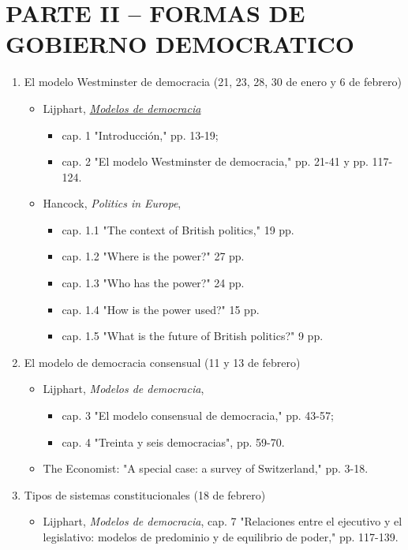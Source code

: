 \documentclass{article}
\begin{document}
\section{PARTE II – FORMAS DE GOBIERNO DEMOCRATICO}
\label{sec:orgbfedb29}
\begin{enumerate}
\item El modelo Westminster de democracia  (21, 23, 28, 30 de enero y 6 de febrero)
\label{sec:org8bf7db2}
\begin{itemize}
\item Lijphart, \href{https://github.com/emagar/ep3/blob/master/lecturas/lijphart-mod-democ}{\emph{Modelos de democracia}}
\begin{itemize}
\item cap. 1 "Introducción," pp. 13-19;
\item cap. 2 "El modelo Westminster de democracia," pp. 21-41 y pp. 117-124.
\end{itemize}
\item Hancock, \emph{Politics in Europe}, 
\begin{itemize}
\item cap. 1.1 "The context of British politics," 19 pp.
\item cap. 1.2 "Where is the power?" 27 pp.
\item cap. 1.3 "Who has the power?" 24 pp.
\item cap. 1.4 "How is the power used?" 15 pp.
\item cap. 1.5 "What is the future of British politics?" 9 pp.
\end{itemize}
\end{itemize}
\item El modelo de democracia consensual  (11 y 13 de febrero)
\label{sec:org1332a14}
\begin{itemize}
\item Lijphart, \emph{Modelos de democracia}, 
\begin{itemize}
\item cap. 3 "El modelo consensual de democracia," pp. 43-57;
\item cap. 4 "Treinta y seis democracias", pp. 59-70.
\end{itemize}
\item The Economist: "A special case: a survey of Switzerland," pp. 3-18.
\end{itemize}
\item Tipos de sistemas constitucionales  (18 de febrero)
\label{sec:orgb3a8ee6}
\begin{itemize}
\item Lijphart, \emph{Modelos de democracia}, cap. 7 "Relaciones entre el ejecutivo y el legislativo: modelos de predominio y de equilibrio de poder," pp. 117-139.

\end{itemize}
\end{enumerate}
\end{document}
